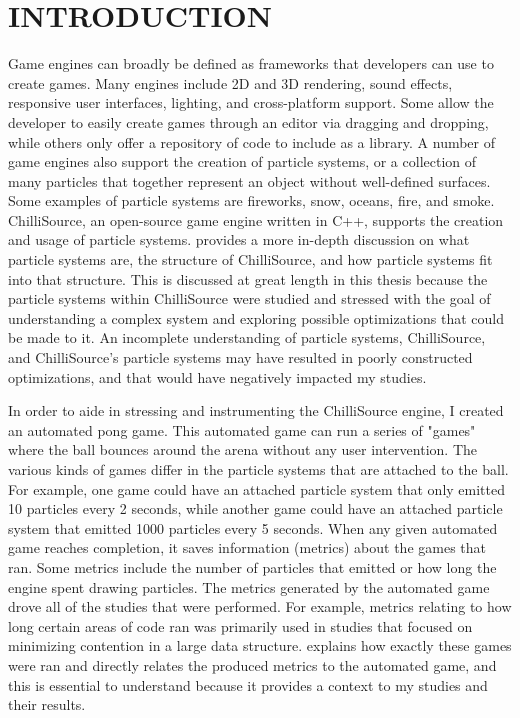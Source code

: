 
\chapter{INTRODUCTION}\label{ch:intro}

Game engines can broadly be defined as frameworks that developers can use to create games. Many engines include 2D and 3D rendering, sound effects, responsive user interfaces, lighting, and cross-platform support. Some allow the developer to easily create games through an editor via dragging and dropping, while others only offer a repository of code to include as a library. A number of game engines also support the creation of particle systems, or a collection of many particles that together represent an object without well-defined surfaces. Some examples of particle systems are fireworks, snow, oceans, fire, and smoke. ChilliSource, an open-source game engine written in C++, supports the creation and usage of particle systems.  provides a more in-depth discussion on what particle systems are, the structure of ChilliSource, and how particle systems fit into that structure. This is discussed at great length in this thesis because the particle systems within ChilliSource were studied and stressed with the goal of understanding a complex system and exploring possible optimizations that could be made to it. An incomplete understanding of particle systems, ChilliSource, and ChilliSource's particle systems may have resulted in poorly constructed optimizations, and that would have negatively impacted my studies.

In order to aide in stressing and instrumenting the ChilliSource engine, I created an automated pong game. This automated game can run a series of "games" where the ball bounces around the arena without any user intervention. The various kinds of games differ in the particle systems that are attached to the ball. For example, one game could have an attached particle system that only emitted 10 particles every 2 seconds, while another game could have an attached particle system that emitted 1000 particles every 5 seconds. When any given automated game reaches completion, it saves information (metrics) about the games that ran. Some metrics include the number of particles that emitted or how long the engine spent drawing particles. The metrics generated by the automated game drove all of the studies that were performed. For example, metrics relating to how long certain areas of code ran was primarily used in studies that focused on minimizing contention in a large data structure.  explains how exactly these games were ran and directly relates the produced metrics to the automated game, and this is essential to understand because it provides a context to my studies and their results.

